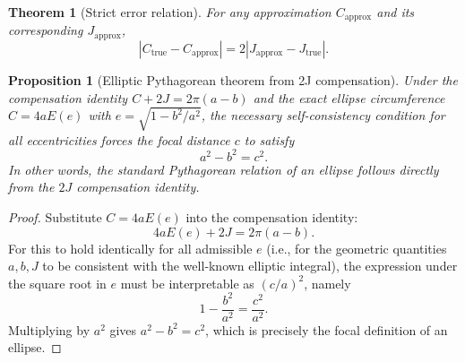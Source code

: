 \documentclass[12pt,a4paper]{article}
\newtheorem{theorem}{Theorem}[section]
\newtheorem{proposition}{Proposition}[section]
\begin{document}
\begin{theorem}[Strict error relation]\label{thm:error}
For any approximation $C_{\text{approx}}$ and its corresponding $J_{\text{approx}}$,
\begin{equation}\label{eq:error}
|C_{\text{true}} - C_{\text{approx}}| = 2|J_{\text{approx}} - J_{\text{true}}|.
\end{equation}
\end{theorem}

\begin{proposition}[Elliptic Pythagorean theorem from 2J compensation]\label{prop:pythagorean}
Under the compensation identity $C + 2J = 2\pi(a-b)$ and the exact ellipse circumference $C = 4aE(e)$ with $e = \sqrt{1-b^2/a^2}$, the necessary self-consistency condition for all eccentricities forces the focal distance $c$ to satisfy
\begin{equation}
a^2 - b^2 = c^2.
\end{equation}
In other words, the standard Pythagorean relation of an ellipse follows directly from the $2J$ compensation identity.
\end{proposition}
\begin{proof}
Substitute $C = 4aE(e)$ into the compensation identity:
\[
4aE(e) + 2J = 2\pi(a-b).
\]
For this to hold identically for all admissible $e$ (i.e., for the geometric quantities $a,b,J$ to be consistent with the well‑known elliptic integral), the expression under the square root in $e$ must be interpretable as $(c/a)^2$, namely
\[
1 - \frac{b^2}{a^2} = \frac{c^2}{a^2}.
\]
Multiplying by $a^2$ gives $a^2 - b^2 = c^2$, which is precisely the focal definition of an ellipse.
\end{proof}
\end{document}
